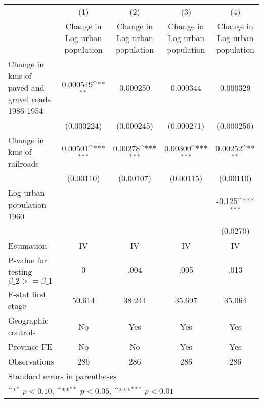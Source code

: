 {
\def\sym#1{\ifmmode^{#1}\else\(^{#1}\)\fi}
\begin{tabular}{l*{4}{c}}
\hline\hline
                    &\multicolumn{1}{c}{(1)}&\multicolumn{1}{c}{(2)}&\multicolumn{1}{c}{(3)}&\multicolumn{1}{c}{(4)}\\
                    &\multicolumn{1}{c}{Change in Log urban population}&\multicolumn{1}{c}{Change in Log urban population}&\multicolumn{1}{c}{Change in Log urban population}&\multicolumn{1}{c}{Change in Log urban population}\\
\hline
Change in kms of paved and gravel roads 1986-1954&    0.000549\sym{**} &    0.000250         &    0.000344         &    0.000329         \\
                    &  (0.000224)         &  (0.000245)         &  (0.000271)         &  (0.000256)         \\
[1em]
Change in kms of railroads&     0.00501\sym{***}&     0.00278\sym{***}&     0.00300\sym{***}&     0.00252\sym{**} \\
                    &   (0.00110)         &   (0.00107)         &   (0.00115)         &   (0.00110)         \\
[1em]
Log urban population 1960&                     &                     &                     &      -0.125\sym{***}\\
                    &                     &                     &                     &    (0.0270)         \\
\hline
Estimation          &          IV         &          IV         &          IV         &          IV         \\
P-value for testing $\beta\_2 >= \beta\_1$&           0         &        .004         &        .005         &        .013         \\
F-stat first stage  &      50.614         &      38.244         &      35.697         &      35.064         \\
Geographic controls &          No         &         Yes         &         Yes         &         Yes         \\
Province FE         &          No         &          No         &         Yes         &         Yes         \\
Observations        &         286         &         286         &         286         &         286         \\
\hline\hline
\multicolumn{5}{l}{\footnotesize Standard errors in parentheses}\\
\multicolumn{5}{l}{\footnotesize \sym{*} \(p<0.10\), \sym{**} \(p<0.05\), \sym{***} \(p<0.01\)}\\
\end{tabular}
}
